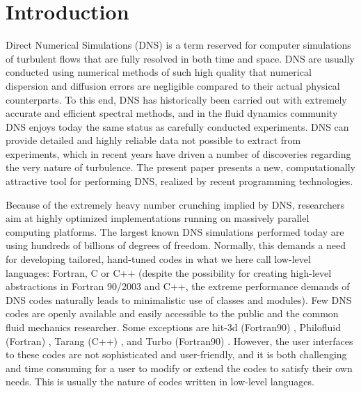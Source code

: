 \documentclass[final,1p,times]{elsarticle}
\begin{document}
\section{Introduction}
Direct Numerical Simulations (DNS) is a term reserved for computer simulations of turbulent flows that are
fully resolved in both time and space. DNS are usually conducted using numerical methods of such high
quality that numerical dispersion and diffusion errors are negligible compared to their actual physical
counterparts. To this end, DNS has historically been carried out with extremely accurate and efficient
spectral methods, and in the fluid dynamics community DNS enjoys  today the same status as carefully
conducted experiments. DNS can provide detailed and highly reliable data not possible to extract from
experiments, which in recent years have driven a number of discoveries regarding the very nature of
turbulence. The present paper presents a new, computationally attractive tool for performing DNS, realized
by recent programming technologies.

Because of the extremely heavy number crunching implied by DNS,
researchers aim at highly optimized implementations running on
massively parallel computing platforms. The largest known DNS
simulations performed today are using hundreds of billions of degrees
of freedom. Normally, this demands a need for developing tailored, hand-tuned
codes in what we here call low-level languages: Fortran, C or C++ (despite
the possibility for creating high-level abstractions in Fortran 90/2003 and
C++, the extreme performance demands of DNS codes naturally leads to
minimalistic use of classes and modules). Few
DNS codes are openly available and easily accessible to the public and
the common fluid mechanics researcher. Some exceptions are hit-3d
(Fortran90) \cite{hit-3d}, Philofluid (Fortran) \cite{philofluid},
Tarang (C++) \cite{tarang}, and Turbo (Fortran90)
\cite{turbo}. However, the user interfaces to these codes are not sophisticated and user-friendly,
and it is both challenging and time consuming for a user to
modify or extend the codes to satisfy their own needs. This is usually
the nature of codes written in low-level languages.
\end{document}
